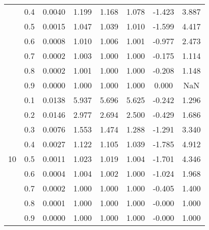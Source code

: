 \documentclass[11pt,a4paper]{report}
\begin{document}
\begin{longtable}{ | c | c || c | c | c | c | c | c | }
 & 0.4 & 0.0040 & 1.199 & 1.168 & 1.078 & -1.423 & 3.887 \\
 & 0.5 & 0.0015 & 1.047 & 1.039 & 1.010 & -1.599 & 4.417 \\
 & 0.6 & 0.0008 & 1.010 & 1.006 & 1.001 & -0.977 & 2.473 \\
 & 0.7 & 0.0002 & 1.003 & 1.000 & 1.000 & -0.175 & 1.114 \\
 & 0.8 & 0.0002 & 1.001 & 1.000 & 1.000 & -0.208 & 1.148 \\
 & 0.9 & 0.0000 & 1.000 & 1.000 & 1.000 & 0.000 & NaN \\
 \hline
\multirow{9}{*}{10} & 0.1 & 0.0138 & 5.937 & 5.696 & 5.625 & -0.242 & 1.296 \\
 & 0.2 & 0.0146 & 2.977 & 2.694 & 2.500 & -0.429 & 1.686 \\
 & 0.3 & 0.0076 & 1.553 & 1.474 & 1.288 & -1.291 & 3.340 \\
 & 0.4 & 0.0027 & 1.122 & 1.105 & 1.039 & -1.785 & 4.912 \\
 & 0.5 & 0.0011 & 1.023 & 1.019 & 1.004 & -1.701 & 4.346 \\
 & 0.6 & 0.0004 & 1.004 & 1.002 & 1.000 & -1.024 & 1.968 \\
 & 0.7 & 0.0002 & 1.000 & 1.000 & 1.000 & -0.405 & 1.400 \\
 & 0.8 & 0.0001 & 1.000 & 1.000 & 1.000 & -0.000 & 1.000 \\
 & 0.9 & 0.0000 & 1.000 & 1.000 & 1.000 & -0.000 & 1.000 \\
 \hline
\hline
\end{longtable}
\end{document}
